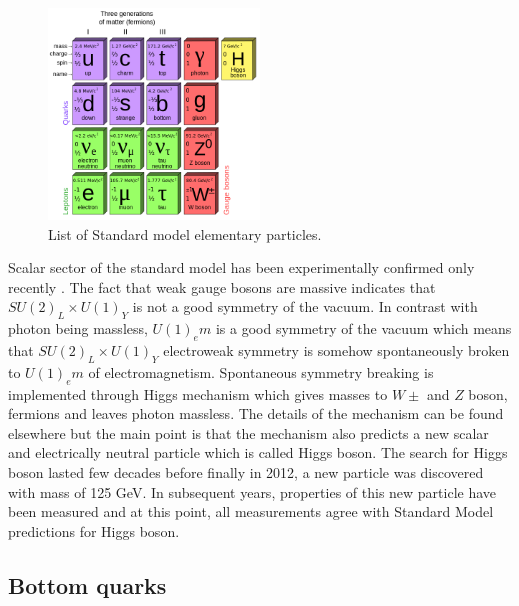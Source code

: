 \begin{figure}[htbp]
	\centering
		\includegraphics[width=0.5\textwidth]{Figures/Elementary_Particles.png}
	\caption[List of Standard model elementary particles]{List of Standard model elementary particles.}
	\label{fig:SM_particles}
\end{figure} 
\par Scalar sector of the standard model has been experimentally confirmed only recently \cite{Aad:2012tfa,Chatrchyan:2012ufa}. The fact that weak gauge bosons are massive indicates that $SU(2)_L \times U(1)_Y$ is not a good symmetry of the vacuum. In contrast with photon being massless, $U(1)_em$ is a good symmetry of the vacuum which means that $SU(2)_L \times U(1)_Y$ electroweak symmetry is somehow spontaneously broken to $U(1)_em$ of electromagnetism. Spontaneous symmetry breaking is implemented through Higgs mechanism which gives masses to $W\pm$ and $Z$ boson, fermions and leaves photon massless. The details of the mechanism can be found elsewhere \cite{Griffiths:1987tj} but the main point is that the mechanism also predicts a new scalar and electrically neutral particle which is called Higgs boson. The search for Higgs boson lasted few decades before finally in 2012, a new particle was discovered with mass of 125 GeV. In subsequent years, properties of this new particle have been measured and at this point, all measurements agree with Standard Model predictions for Higgs boson.    
   


\subsection{Bottom quarks}

